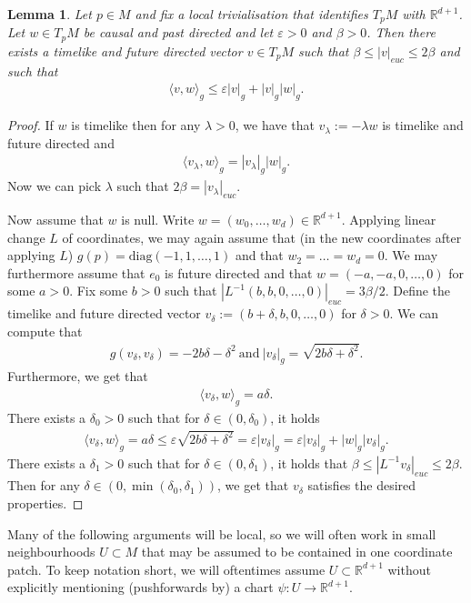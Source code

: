 \documentclass[a4paper,10pt]{article}
\newtheorem{lemma}[theorem]{Lemma}
\numberwithin{equation}{section}
\newcommand{\R}{\mathbb{R}}
\newcommand{\e}{\varepsilon}
\newcommand{\diag}{\mathrm{diag}}
\begin{document}
\begin{lemma}\label{cauchy_schwartz_optimiser}
   Let $p \in M$ and fix a local trivialisation that identifies $T_pM$ with $\R^{d+1}$. Let $w \in T_pM$ be causal and past directed and let $\e>0$ and $\beta>0$. Then there exists a timelike and future directed vector $v \in T_pM$ such that $\beta \leq |v|_{euc} \leq 2\beta$ and such that
   \begin{align*}
       \langle v, w\rangle_g \leq \e|v|_g + |v|_g|w|_g.
   \end{align*}
\end{lemma}
\begin{proof}
    If $w$ is timelike then for any $\lambda>0$, we have that $v_\lambda := -\lambda w$ is timelike and future directed and 
    \begin{align*}
        \langle v_\lambda, w\rangle_g =|v_\lambda|_g|w|_g.
    \end{align*}
    Now we can pick $\lambda$ such that $2\beta =|v_\lambda|_{euc}$. 
    
    Now assume that $w$ is null. Write $w=(w_0, \ldots, w_d) \in \R^{d+1}$. Applying linear change $L$ of coordinates, we may again assume that (in the new coordinates after applying $L$) $g(p) = \diag(-1, 1, \ldots, 1)$ and that $w_2= \ldots=w_d=0$. 
    We may furthermore assume that $e_0$ is future directed and that $w=(-a, -a, 0, \ldots, 0)$ for some $a >0$.
    Fix some $b >0$ such that $|L^{-1}(b, b, 0,\ldots, 0)|_{euc}=3\beta/2$. 
    Define the timelike and future directed vector $v_\delta := (b+\delta, b, 0, \ldots, 0)$ for $\delta >0$. We can compute that 
    \begin{align*}
        g(v_\delta,v_\delta) = -2b\delta-\delta^2 \ \mathrm{and}\ |v_\delta|_g = \sqrt{2b\delta+\delta^2}.
    \end{align*}
    Furthermore, we get that 
    \begin{align*}
        \langle v_\delta, w \rangle_g = a \delta.
    \end{align*}
    There exists a $\delta_0 >0$ such that for $\delta \in (0, \delta_0)$, it holds
    \begin{align*}
         \langle v_\delta, w \rangle_g = a \delta \leq \e\sqrt{2b\delta + \delta^2} = \e |v_\delta|_g  =  \e |v_\delta|_g + |w|_g |v_\delta|_g.
    \end{align*}
    There exists a $\delta_1 >0$ such that for $\delta \in (0, \delta_1)$, it holds that $\beta \leq |L^{-1}v_\delta|_{euc} \leq 2\beta$. Then for any $\delta \in (0, \min(\delta_0, \delta_1))$, we get that $v_\delta$ satisfies the desired properties.  
\end{proof}
Many of the following arguments will be local, so we will often work in small neighbourhoods $U \subset M$ that may be assumed to be contained in one coordinate patch. To keep notation short, we will oftentimes assume $U \subset \R^{d+1}$ without explicitly mentioning (pushforwards by) a chart $\psi: U \to \R^{d+1}$.
\smallskip
\end{document}

